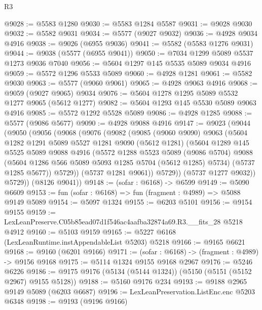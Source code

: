 \begin{lexlean}{R3}
\begin{coremodule}
@9028 := @5583 @1280
@9030 := @5583 @1284 @5587
@9031 := @9028 @9030
@9032 := @5582 @9031
@9034 := @5577 (@9027 @9032)
@9036 := @4928 @9034 @4916
@9038 := @9026 (@6955 @9036)
@9041 := @5582 (@5583 @1276 @9031)
@9044 := @9038 (@5577 (@6955 @9041))
@9050 := @7034 @1299 @5089 @5537 @1273 @9036 @7040
@9056 := @5604 @1297 @145 @5535 @5089 @9034 @4916
@9059 := @5572 @1296 @5533 @5089
@9060 := @4928 @1281
@9061 := @5582 @9030
@9063 := @5577 (@9060 @9061)
@9065 := @4928 @9063 @4916
@9068 := @9059 (@9027 @9065) @9034
@9076 := @5604 @1278 @1295 @5089 @5532 @1277 @9065 (@5612 @1277)
@9082 := @5604 @1293 @145 @5530 @5089 @9063 @4916
@9085 := @5572 @1292 @5528 @5089
@9086 := @4928 @1285
@9088 := @5577 (@9086 @5677)
@9090 := @4928 @9088 @4916
@9147 := @9023
    (@9044
      (@9050
        (@9056
          (@9068
            (@9076
              (@9082
                (@9085
                  (@9060 @9090)
                  @9063
                  (@5604
                    @1282
                    @1291
                    @5089
                    @5527
                    @1281
                    @9090
                    (@5612 @1281)
                    (@5604
                      @1289
                      @145
                      @5525
                      @5089
                      @9088
                      @4916
                      (@5572
                        @1288
                        @5523
                        @5089
                        (@9086 @5704)
                        @9088
                        (@5604 @1286 @566 @5089 @5093 @1285 @5704 (@5612 @1285) @5734)
                        (@5737 @1285 @5677))
                      @5729))
                  (@5737 @1281 @9061))
                @5729))
            (@5737 @1277 @9032))
          @5729))
      (@8126 @9041))
@9148 := (sofar : @6168) -> @6599
@9149 := @5090 @6609
@9153 := fun (sofar : @6168) => fun (fragment : @4989) => @5088 @9149 @5089
@9154 := @5097 @1324
@9155 := @6203 @5101
@9156 := @9154 @9155
@9159 := LexLeanPreserve.C05b85ead07d1f546ac4aafba32874a69.R3.__fits_28 @5218 @4912
@9160 := @5103 @9159
@9165 := @5227 @6168 (LexLeanRuntime.instAppendableList @5203) @5218
@9166 := @9165 @6621
@9168 := @9160 (@6201 @9166)
@9171 := (sofar : @6168) -> (fragment : @4989) -> @9156 @9168
@9175 := @5114 @1324 @9155 @9168 @2967
@9176 := @5246 @6226
@9186 := @9175 @9176 (@5134 (@5144 @1324)) (@5150 (@5151 (@5152 @2967) @9155 @5128))
@9188 := @5160 @9176 @234
@9193 := @9188 @2965 @9149 @5089 (@6203 @6687)
@9196 := LexLeanPreservation.ListEnc.enc @5203 @6348
@9198 := @9193 (@9196 @9166)

\end{coremodule}
\end{lexlean}
